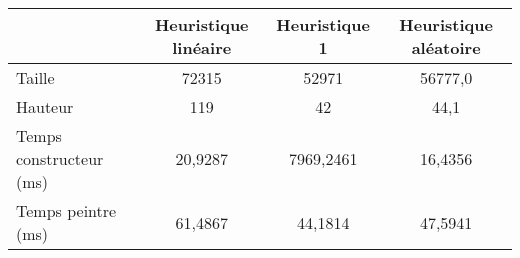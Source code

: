 \begin{center}
{\tabulinesep=1.2mm
\begin{tabu}{|l|c|c|c|}
  \hline
  & Heuristique linéaire  & Heuristique 1 & Heuristique aléatoire \\ 
  \hline
  Taille &     72315&     52971&   56777,0  \\ 
  \hline
  Hauteur &       119&        42&      44,1  \\ 
  \hline
  Temps constructeur (ms) &         20,9287&       7969,2461&         16,4356  \\ 
  \hline
  Temps peintre (ms) &           61,4867&          44,1814&          47,5941  \\ 
  \hline
\end{tabu}
}
\end{center}

